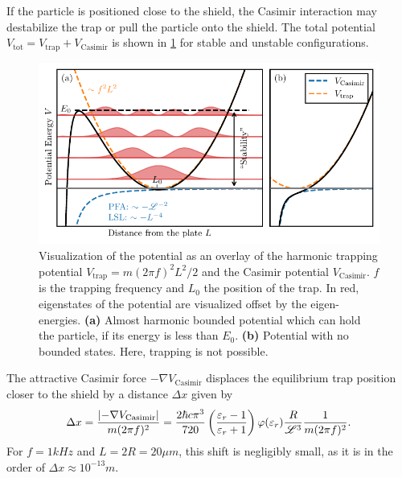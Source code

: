 If the particle is positioned close to the shield, the Casimir interaction may destabilize the trap or pull the particle onto the shield. The total potential $V_\mathrm{tot}=V_\mathrm{trap} + V_\mathrm{Casimir}$ is shown in \cref{fig:4:trap-eigenstates} for stable and unstable configurations.
\begin{figure}[!htbp]
  \centering
  \includegraphics[width=\textwidth]{./../figures/others/trapping-potential-eigenstates.pdf}
  \caption{Visualization of the potential as an overlay of the harmonic trapping potential $V_\mathrm{trap} = m (2\pi f)^2 L^2 / 2$ and the Casimir potential $V_\mathrm{Casimir}$. $f$ is the trapping frequency and $L_0$ the position of the trap. In red, eigenstates of the potential are visualized offset by the eigen-energies.
  \textbf{(a)} Almost harmonic bounded potential which can hold the particle, if its energy is less than $E_0$.
  \textbf{(b)} Potential with no bounded states. Here, trapping is not possible.}
  \label{fig:4:trap-eigenstates}
\end{figure}
The attractive Casimir force $-\nabla V_\mathrm{Casimir}$ displaces the equilibrium trap position closer to the shield by a distance $\Delta x$ given by
\begin{equation}
  \Delta x = \frac{\left\lvert-\nabla V_\mathrm{Casimir}\right\rvert}{m (2\pi f)^2} = \frac{2 \hbar c \pi^3}{720} \left(\frac{\varepsilon_r - 1}{\varepsilon_r + 1}\right) \varphi(\varepsilon_r) \frac{R}{\mathscr{L}^3} \frac{1}{m (2\pi f)^2} .
\end{equation}
For $f=1\si{kHz}$ and $L = 2R = 20\si{\mu m}$, this shift is negligibly small, as it is in the order of $\Delta x \approx 10^{-13}\si{m}$.

